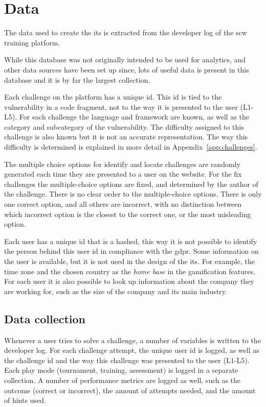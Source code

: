 \section{Data}
\label{sec:data}

The data used to create the \gls{its} is extracted from the developer log of the \gls{scw} training platform.

While this database was not originally intended to be used for analytics, and other data sources have been set up since, lots of useful data is present in this database and it is by far the largest collection. 

Each challenge on the platform has a unique \gls{id}.
This \gls{id} is tied to the \gls{vulnerability} in a code fragment, not to the way it is presented to the user (L1-L5).
For each challenge the language and framework are known, as well as the category and subcategory of the vulnerability.
The difficulty assigned to this challenge is also known but it is not an accurate representation.
The way this difficulty is determined is explained in more detail in Appendix~\ref{app:challenges}.

The multiple choice options for identify and locate challenges are randomly generated each time they are presented to a user on the website.
For the fix challenges the multiple-choice options are fixed, and determined by the author of the challenge.
There is no clear order to the multiple-choice options.
There is only one correct option, and all others are incorrect, with no distinction between which incorrect option is the closest to the correct one, or the most misleading option.

Each user has a unique \gls{id} that is a hashed, this way it is not possible to identify the person behind this user \gls{id} in compliance with the \gls{gdpr}.
Some information on the user is available, but it is not used in the design of the \gls{its}.
For example, the time zone and the chosen country as the \textit{home base} in the gamification features.
For each user it is also possible to look up information about the company they are working for, such as the size of the company and its main industry.

\subsection{Data collection}
Whenever a user tries to solve a challenge, a number of variables is written to the developer log.
For each challenge attempt, the unique user \gls{id} is logged, as well as the challenge \gls{id} and the way this challenge was presented to the user (L1-L5).
Each play mode (tournament, training, assessment) is logged in a separate collection.
A number of performance metrics are logged as well, such as the outcome (correct or incorrect), the amount of attempts needed, and the amount of hints used.


